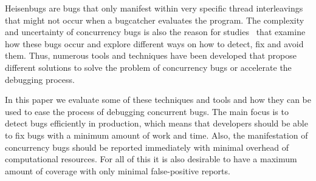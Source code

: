 \documentclass[conference]{IEEEtran}
\begin{document}
Heisenbugs are bugs that only manifest within very specific thread interleavings that might not occur when a bugcatcher evaluates the program.
The complexity and uncertainty of concurrency bugs is also the reason for studies~\cite{tu2019go} that examine how these bugs occur and explore different ways on how to detect, fix and avoid them.
Thus, numerous tools and techniques have been developed that propose different solutions to solve the problem of concurrency bugs or accelerate the debugging process.

In this paper we evaluate some of these techniques and tools and how they can be used to ease the process of debugging concurrent bugs.
The main focus is to detect bugs efficiently in production, which means that developers should be able to fix bugs with a minimum amount of work and time.
Also, the manifestation of concurrency bugs should be reported immediately with minimal overhead of computational resources.
For all of this it is also desirable to have a maximum amount of coverage with only minimal false-positive reports.
\end{document}
